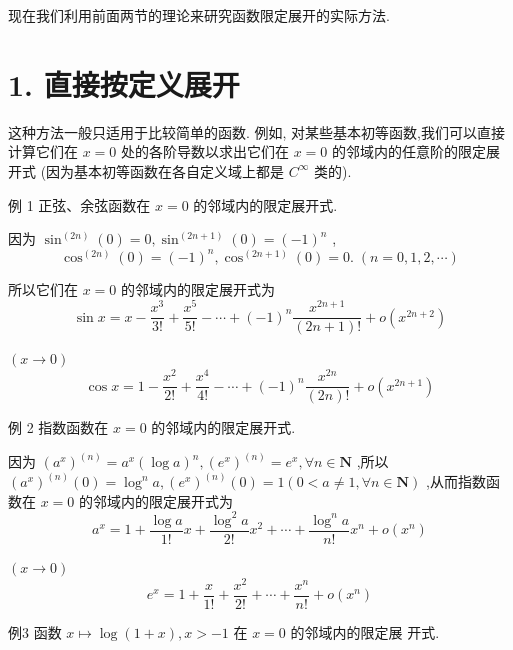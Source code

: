 现在我们利用前面两节的理论来研究函数限定展开的实际方法.

\section*{1. 直接按定义展开}

这种方法一般只适用于比较简单的函数. 例如, 对某些基本初等函数,我们可以直接计算它们在 $x = 0$ 处的各阶导数以求出它们在 $x = 0$ 的邻域内的任意阶的限定展开式 (因为基本初等函数在各自定义域上都是 ${C}^{\infty }$ 类的).

例 1 正弦、余弦函数在 $x = 0$ 的邻域内的限定展开式.

因为 ${\sin }^{\left( 2n\right) }\left( 0\right)  = 0,{\sin }^{\left( 2n + 1\right) }\left( 0\right)  = {\left( -1\right) }^{n}$ ,
$${\cos }^{\left( 2n\right) }\left( 0\right)  = {\left( -1\right) }^{n},{\cos }^{\left( 2n + 1\right) }\left( 0\right)  = 0.\;\left( {n = 0,1,2,\cdots }\right)$$

所以它们在 $x = 0$ 的邻域内的限定展开式为
$$\sin x = x - \frac{{x}^{3}}{3!} + \frac{{x}^{5}}{5!} - \cdots  + {\left( -1\right) }^{n}\frac{{x}^{{2n} + 1}}{\left( {{2n} + 1}\right) !} + o\left( {x}^{{2n} + 2}\right)$$

$\left( {x \rightarrow  0}\right)$
$$\cos x = 1 - \frac{{x}^{2}}{2!} + \frac{{x}^{4}}{4!} - \cdots  + {\left( -1\right) }^{n}\frac{{x}^{2n}}{\left( {2n}\right) !} + o\left( {x}^{{2n} + 1}\right)$$

例 2 指数函数在 $x = 0$ 的邻域内的限定展开式.

因为 ${\left( {a}^{x}\right) }^{\left( n\right) } = {a}^{x}{\left( \log a\right) }^{n},{\left( {e}^{x}\right) }^{\left( n\right) } = {e}^{x},\forall n \in  \mathbf{N}$ ,所以 ${\left( {a}^{x}\right) }^{\left( n\right) }\left( 0\right)  = {\log }^{n}a,{\left( {e}^{x}\right) }^{\left( n\right) }\left( 0\right)  = 1\left( {0 < a \neq  1,\forall n \in  \mathbf{N}}\right)$ ,从而指数函数在 $x = 0$ 的邻域内的限定展开式为
$${a}^{x} = 1 + \frac{\log a}{1!}x + \frac{{\log }^{2}a}{2!}{x}^{2} + \cdots  + \frac{{\log }^{n}a}{n!}{x}^{n} + o\left( {x}^{n}\right)$$

$\left( {x \rightarrow  0}\right)$
$${e}^{x} = 1 + \frac{x}{1!} + \frac{{x}^{2}}{2!} + \cdots  + \frac{{x}^{n}}{n!} + o\left( {x}^{n}\right)$$

例3 函数 $x \mapsto  \log \left( {1 + x}\right) ,x >  - 1$ 在 $x = 0$ 的邻域内的限定展 开式.


